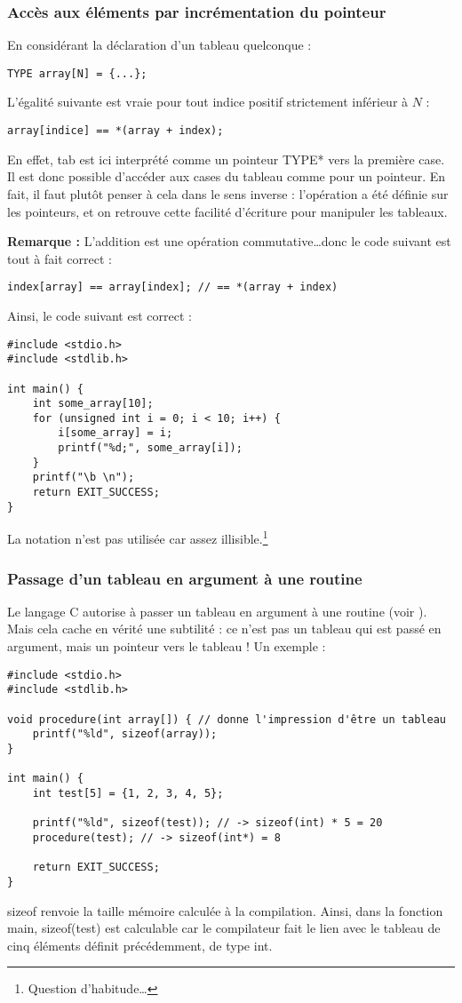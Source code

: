 \documentclass[../../../main.tex]{subfiles}
\begin{document}
\subsubsection{Accès aux éléments par incrémentation du pointeur}
En considérant la déclaration d'un tableau quelconque :
\begin{verbatim}
TYPE array[N] = {...};
\end{verbatim}
L'égalité suivante est vraie pour tout indice positif strictement inférieur à $N$ :
\begin{verbatim}
array[indice] == *(array + index);
\end{verbatim}
En effet, \textsf{tab} est ici interprété comme un pointeur \textsf{TYPE*} vers la première case. Il est donc possible d'accéder aux cases du tableau comme pour un pointeur. En fait, il faut plutôt penser à cela dans le sens inverse : l'opération a été définie sur les pointeurs, et on retrouve cette facilité d'écriture pour manipuler les tableaux.
 
\textbf{Remarque :} L'addition est une opération commutative\dots donc le code suivant est tout à fait correct :
\begin{verbatim}
index[array] == array[index]; // == *(array + index)
\end{verbatim}
Ainsi, le code suivant est correct :
\begin{verbatim}
#include <stdio.h>
#include <stdlib.h>

int main() {
	int some_array[10];
	for (unsigned int i = 0; i < 10; i++) {
		i[some_array] = i;
		printf("%d;", some_array[i]);
	}
	printf("\b \n");
	return EXIT_SUCCESS;
}
\end{verbatim}
La notation n'est pas utilisée car assez illisible.\footnote{Question d'habitude\dots}
\subsubsection{Passage d'un tableau en argument à une routine}
Le langage C autorise à passer un tableau en argument à une routine (voir ). Mais cela cache en vérité une subtilité : ce n'est pas un tableau qui est passé en argument, mais un pointeur vers le tableau !\newline
Un exemple :
\begin{verbatim}
#include <stdio.h>
#include <stdlib.h>

void procedure(int array[]) { // donne l'impression d'être un tableau
	printf("%ld", sizeof(array));
}

int main() {
	int test[5] = {1, 2, 3, 4, 5};
	
	printf("%ld", sizeof(test)); // -> sizeof(int) * 5 = 20
	procedure(test); // -> sizeof(int*) = 8

	return EXIT_SUCCESS;
}
\end{verbatim}
\textsf{sizeof} renvoie la taille mémoire calculée à la compilation. Ainsi, dans la fonction \textsf{main}, \textsf{sizeof(test)} est calculable car le compilateur fait le lien avec le tableau de cinq éléments définit précédemment, de type \textsf{int}.
 
\end{document}
